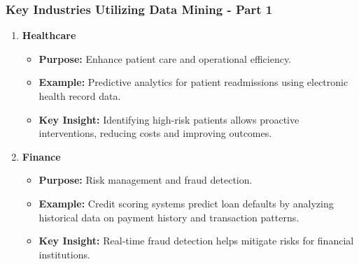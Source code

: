 \documentclass[aspectratio=169]{beamer}
\begin{document}
\begin{frame}[fragile]
    \frametitle{Key Industries Utilizing Data Mining - Part 1}
    \begin{enumerate}
        \item \textbf{Healthcare}
        \begin{itemize}
            \item \textbf{Purpose:} Enhance patient care and operational efficiency.
            \item \textbf{Example:} Predictive analytics for patient readmissions using electronic health record data.
            \item \textbf{Key Insight:} Identifying high-risk patients allows proactive interventions, reducing costs and improving outcomes.
        \end{itemize}
        
        \item \textbf{Finance}
        \begin{itemize}
            \item \textbf{Purpose:} Risk management and fraud detection.
            \item \textbf{Example:} Credit scoring systems predict loan defaults by analyzing historical data on payment history and transaction patterns.
            \item \textbf{Key Insight:} Real-time fraud detection helps mitigate risks for financial institutions.
        \end{itemize}
    \end{enumerate}
\end{frame}
\end{document}
